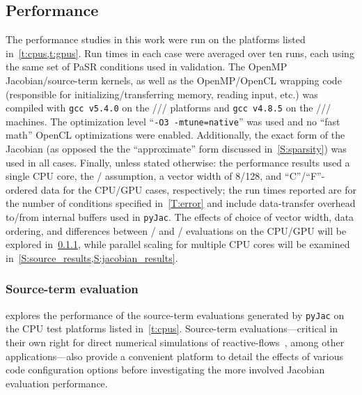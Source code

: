 \documentclass[12pt,number,sort&compress,preprint]{elsarticle}
\begin{document}
\subsection{Performance}
\label{S:results}
The performance studies in this work were run on the platforms listed in~\cref{t:cpus,t:gpus}.
Run times in each case were averaged over ten runs, each using the same set of PaSR conditions used in validation.
The OpenMP Jacobian\slash source-term kernels, as well as the OpenMP\slash OpenCL wrapping code (responsible for initializing\slash transferring memory, reading input, etc.) was compiled with \texttt{gcc v5.4.0} on the \avx/\slash\gpunew/ platforms and \texttt{gcc v4.8.5} on the \sse/\slash\gpuold/ machines.
The optimization level ``\texttt{-O3 -mtune=native}'' was used and no ``fast math'' OpenCL optimizations were enabled.
Additionally, the exact form of the Jacobian (as opposed the the ``approximate'' form discussed in~\cref{S:sparsity}) was used in all cases.
Finally, unless stated otherwise: the performance results used a single CPU core, the \conp/ assumption, a vector width of \num{8}\slash\num{128}, and ``C''\slash ``F''-ordered data for the CPU\slash GPU cases, respectively; the run times reported are for the number of conditions specified in~\cref{T:error} and include data-transfer overhead to\slash from internal buffers used in \texttt{pyJac}.
The effects of choice of vector width, data ordering, and differences between \conp/ and \conv/ evaluations on the CPU\slash GPU will be explored in~\cref{S:source_results}, while parallel scaling for multiple CPU cores will be examined in~\cref{S:source_results,S:jacobian_results}.

\subsubsection{Source-term evaluation}
\label{S:source_results}

 explores the performance of the source-term evaluations generated by \texttt{pyJac} on the CPU test platforms listed in~\cref{t:cpus}.
Source-term evaluations---critical in their own right for direct numerical simulations of reactive-flows~\cite{Spafford:2010aa}, among other applications---also provide a convenient platform to detail the effects of various code configuration options before investigating the more involved Jacobian evaluation performance.
\end{document}
